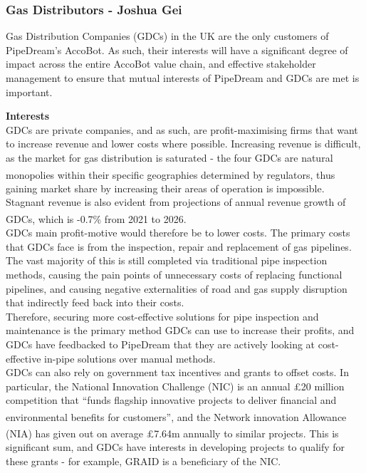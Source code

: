 \documentclass[11pt]{article}		%
\newcommand{\supercite}[1]{\textsuperscript{\cite{#1}}}		%
\begin{document}
		\subsubsection[Gas Distributors]{Gas Distributors - Joshua Gei} \label{GDCstakeholders}
	
		Gas Distribution Companies (GDCs) in the UK are the only customers of PipeDream’s AccoBot. As such, their interests will have a significant degree of impact across the entire AccoBot value chain, and effective stakeholder management to ensure that mutual interests of PipeDream and GDCs are met is important. 
	
	    \textbf{Interests}
	    \\
	    GDCs are private companies, and as such, are profit-maximising firms that want to increase revenue and lower costs where possible. Increasing revenue is difficult, as the market for gas distribution is saturated - the four GDCs are natural monopolies within their specific geographies determined by regulators\supercite{sönnichsen_5_2021}, thus gaining market share by increasing their areas of operation is impossible. Stagnant revenue is also evident from projections of annual revenue growth of GDCs, which is -0.7\% from 2021 to 2026\supercite{Gas_Distribution_Industry}.
        \\ 
        \hspace*{3ex}GDCs main profit-motive would therefore be to lower costs. The primary costs that GDCs face is from the inspection, repair and replacement of gas pipelines. The vast majority of this is still completed via traditional pipe inspection methods, causing the pain points of unnecessary costs of replacing functional pipelines, and causing negative externalities of road and gas supply disruption that indirectly feed back into their costs. 
        \\ 
        \hspace*{3ex}Therefore, securing more cost-effective solutions for pipe inspection and maintenance is the primary method GDCs can use to increase their profits, and GDCs have feedbacked to PipeDream that they are actively looking at cost-effective in-pipe solutions over manual methods. 
        \\ 
        \hspace*{3ex}GDCs can also rely on government tax incentives and grants to offset costs. In particular, the National Innovation Challenge (NIC) is an annual £20 million competition that “funds flagship innovative projects to deliver financial and environmental benefits for customers”\supercite{NIC}, and the Network innovation Allowance (NIA) has given out on average £7.64m annually to similar projects\supercite{NIA}. This is significant sum, and GDCs have interests in developing projects to qualify for these grants - for example, GRAID is a beneficiary of the NIC.  
        
\end{document}
